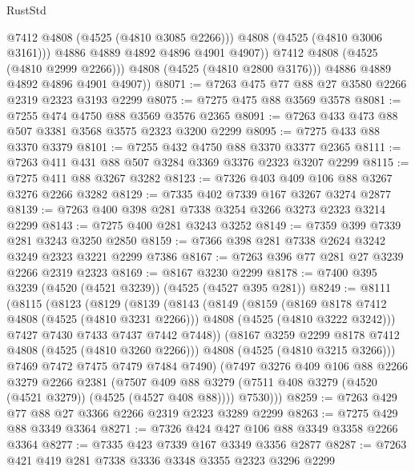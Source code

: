 \begin{lexlean}{RustStd}
\begin{coremodule}
{\begin{coremodule}
{{{{{{{{{{{{{{                    @7412
                    @4808
                    (@4525 (@4810 @3085 @2266)))
                  @4808
                  (@4525 (@4810 @3006 @3161)))
                @4886
                @4889
                @4892
                @4896
                @4901
                @4907))
            @7412
            @4808
            (@4525 (@4810 @2999 @2266)))
          @4808
          (@4525 (@4810 @2800 @3176)))
        @4886
        @4889
        @4892
        @4896
        @4901
        @4907))
@8071 := @7263 @475 @77 @88 @27 @3580 @2266 @2319 @2323 @3193 @2299
@8075 := @7275 @475 @88 @3569 @3578
@8081 := @7255 @474 @4750 @88 @3569 @3576 @2365
@8091 := @7263 @433 @473 @88 @507 @3381 @3568 @3575 @2323 @3200 @2299
@8095 := @7275 @433 @88 @3370 @3379
@8101 := @7255 @432 @4750 @88 @3370 @3377 @2365
@8111 := @7263 @411 @431 @88 @507 @3284 @3369 @3376 @2323 @3207 @2299
@8115 := @7275 @411 @88 @3267 @3282
@8123 := @7326 @403 @409 @106 @88 @3267 @3276 @2266 @3282
@8129 := @7335 @402 @7339 @167 @3267 @3274 @2877
@8139 := @7263 @400 @398 @281 @7338 @3254 @3266 @3273 @2323 @3214 @2299
@8143 := @7275 @400 @281 @3243 @3252
@8149 := @7359 @399 @7339 @281 @3243 @3250 @2850
@8159 := @7366 @398 @281 @7338 @2624 @3242 @3249 @2323 @3221 @2299 @7386
@8167 := @7263 @396 @77 @281 @27 @3239 @2266 @2319 @2323
@8169 := @8167 @3230 @2299
@8178 := @7400 @395 @3239 (@4520 (@4521 @3239)) (@4525 (@4527 @395 @281))
@8249 := @8111
    (@8115
      (@8123
        (@8129
          (@8139
            (@8143
              (@8149
                (@8159
                  (@8169 @8178 @7412 @4808 (@4525 (@4810 @3231 @2266)))
                  @4808
                  (@4525 (@4810 @3222 @3242)))
                @7427
                @7430
                @7433
                @7437
                @7442
                @7448))
            (@8167 @3259 @2299 @8178 @7412 @4808 (@4525 (@4810 @3260 @2266)))
            @4808
            (@4525 (@4810 @3215 @3266)))
          @7469
          @7472
          @7475
          @7479
          @7484
          @7490)
        (@7497
          @3276
          @409
          @106
          @88
          @2266
          @3279
          @2266
          @2381
          (@7507 @409 @88 @3279 (@7511 @408 @3279 (@4520 (@4521 @3279)) (@4525 (@4527 @408 @88))))
          @7530)))
@8259 := @7263 @429 @77 @88 @27 @3366 @2266 @2319 @2323 @3289 @2299
@8263 := @7275 @429 @88 @3349 @3364
@8271 := @7326 @424 @427 @106 @88 @3349 @3358 @2266 @3364
@8277 := @7335 @423 @7339 @167 @3349 @3356 @2877
@8287 := @7263 @421 @419 @281 @7338 @3336 @3348 @3355 @2323 @3296 @2299
}}}}}}}}}}}}}}
\end{coremodule}}
\end{coremodule}
\end{lexlean}
